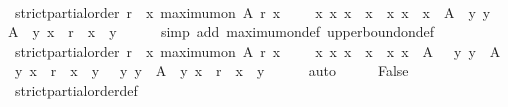\begin{isabellebody}
\ \ \isamarkupfalse%
\ \isamarkupfalse%
\ {\isachardoublequoteopen}strict{\isacharunderscore}partial{\isacharunderscore}order\ r\ {\isasymlongrightarrow}\ {\isacharbraceleft}x{\isachardot}\ maximum{\isacharunderscore}on\ A\ r\ x{\isacharbraceright}\ {\isasymnoteq}\ {\isasymemptyset}\ {\isasymlongrightarrow}\ {\isacharparenleft}{\isasymexists}\ x{}\ x{}{\isachardot}\ x{}\ {\isasymnoteq}\ x{}\ {\isasymand}\ {\isacharbraceleft}x{}{\isacharcomma}\ x{}{\isacharbraceright}\ {\isasymsubseteq}\ {\isacharbraceleft}x\ {\isasymin}\ A{\isachardot}\ {\isasymforall}\ y{\isachardot}\ y\ {\isasymin}\ A\ {\isasymlongrightarrow}\ {\isacharparenleft}y{\isacharcomma}\ x{\isacharparenright}\ {\isasymin}\ r\ {\isasymor}\ x\ {\isacharequal}\ y{\isacharbraceright}{\isacharparenright}{\isachardoublequoteclose}\isanewline
\ \ \ \ \isamarkupfalse%
\ {\isacharparenleft}simp\ add{\isacharcolon}\ maximum{\isacharunderscore}on{\isacharunderscore}def\ upper{\isacharunderscore}bound{\isacharunderscore}on{\isacharunderscore}def{\isacharparenright}\isanewline
\ \ \isamarkupfalse%
\ \isamarkupfalse%
\ {\isachardoublequoteopen}strict{\isacharunderscore}partial{\isacharunderscore}order\ r\ {\isasymlongrightarrow}\ {\isacharbraceleft}x{\isachardot}\ maximum{\isacharunderscore}on\ A\ r\ x{\isacharbraceright}\ {\isasymnoteq}\ {\isasymemptyset}\ {\isasymlongrightarrow}\ {\isacharparenleft}{\isasymexists}\ x{}\ x{}{\isachardot}\ x{}\ {\isasymnoteq}\ x{}\ {\isasymand}\ {\isacharbraceleft}x{}{\isacharcomma}\ x{}{\isacharbraceright}\ {\isasymsubseteq}\ A\ {\isasymand}\ {\isacharparenleft}{\isasymforall}\ y{\isachardot}\ y\ {\isasymin}\ A\ {\isasymlongrightarrow}\ {\isacharparenleft}y{\isacharcomma}\ x{}{\isacharparenright}\ {\isasymin}\ r\ {\isasymor}\ x{}\ {\isacharequal}\ y{\isacharparenright}\ {\isasymand}\ {\isacharparenleft}{\isasymforall}\ y{\isachardot}\ y\ {\isasymin}\ A\ {\isasymlongrightarrow}\ {\isacharparenleft}y{\isacharcomma}\ x{}{\isacharparenright}\ {\isasymin}\ r\ {\isasymor}\ x{}\ {\isacharequal}\ y{\isacharparenright}{\isacharparenright}{\isachardoublequoteclose}\isanewline
\ \ \ \ \isamarkupfalse%
\ auto\isanewline
\ \ \isamarkupfalse%
\ \isamarkupfalse%
\ False\isanewline
\ \ \ \ \isamarkupfalse%
\ strict{\isacharunderscore}partial{\isacharunderscore}order{\isacharunderscore}def\isanewline

\end{isabellebody}
